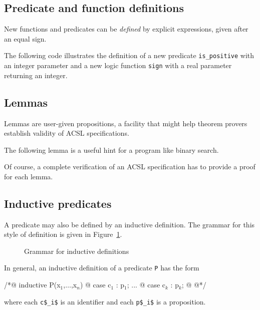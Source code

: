 \subsection{Predicate and function definitions}
New functions and predicates can be \emph{defined} by explicit
expressions, given after an equal sign.
\begin{example}
  The following code  illustrates the
  definition of a new predicate \lstinline{is_positive} with an integer
  parameter and a new logic function \lstinline{sign} with a real
  parameter returning an integer.
\end{example}

\subsection{Lemmas}
Lemmas are user-given propositions, a facility that might help theorem
provers establish validity of ACSL specifications.

\begin{example}
  The following lemma
  is a useful hint for a program like binary search.
\end{example}

Of course, a complete verification of an ACSL specification has to
provide a proof for each lemma.

\subsection{Inductive predicates}
\label{sec:inductivepredicates}

A predicate may also be defined by an inductive definition. The
grammar for this style of definition is given in
Figure~\ref{fig:gram:inductive}.
\begin{figure}[t]
  \begin{cadre} 
    \end{cadre}
  \caption{Grammar for inductive definitions}
\label{fig:gram:inductive}
\end{figure}

In general, an inductive definition of a predicate \lstinline|P| has the form
\begin{listing}{1}
/*@ inductive P(x$_1$,$\ldots$,x$_n$) {
  @   case c$_1$ : p$_1$;
...
  @   case c$_k$ : p$_k$;
  @ }
  @*/
\end{listing}
where each \lstinline|c$_i$| is an identifier and each \lstinline|p$_i$| 
is a proposition.

